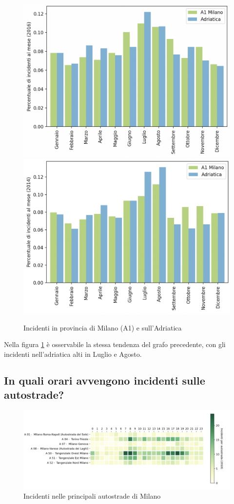 \documentclass[a4paper]{report}
\begin{document}
\begin{figure}
    \includegraphics[width=0.5\linewidth]{../src/incidenti/incidenti_aci/autostrade/milano_adriatica_2016.png}
    \includegraphics[width=0.5\linewidth]{../src/incidenti/incidenti_aci/autostrade/milano_adriatica_2014.png}
    \caption{Incidenti in provincia di Milano (A1) e sull'Adriatica}
    \label{fig:milano-adriatica_tendenza}
\end{figure}

Nella figura \ref{fig:milano-adriatica_tendenza} è osservabile la stessa tendenza del grafo precedente, 
con gli incidenti nell'adriatica alti in Luglio e Agosto. 

\subsection{In quali orari avvengono incidenti sulle autostrade?}

\begin{figure}
    \includegraphics[width=\linewidth]{../src/incidenti/incidenti_aci/autostrade/tangenziali_autostrade.png}
    \caption{Incidenti nelle principali autostrade di Milano}
    \label{fig:tangenziali-autostrade}
\end{figure}
\end{document}
